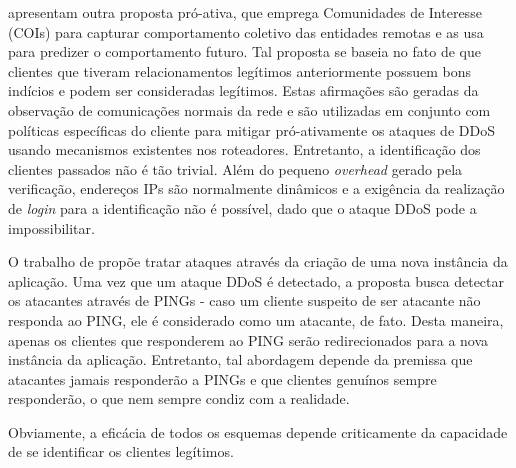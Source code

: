 \documentclass[a4paper, 12pt]{article}
\begin{document}
\cite{Verkaik:2006:PCD:1162666.1162673} apresentam outra proposta pró-ativa, que emprega Comunidades de Interesse (COIs) para capturar comportamento coletivo das entidades remotas e as usa para predizer o comportamento futuro. Tal proposta se baseia no fato de que clientes que tiveram relacionamentos legítimos anteriormente possuem bons indícios e podem ser consideradas legítimos. Estas afirmações são geradas da observação de comunicações normais da rede e são utilizadas em conjunto com políticas específicas do cliente para mitigar pró-ativamente os ataques de DDoS usando mecanismos existentes nos roteadores. 
%
Entretanto, a identificação dos clientes passados não é tão trivial. Além do pequeno \emph{overhead} gerado pela verificação, endereços IPs são normalmente dinâmicos e a exigência da realização de \emph{login} para a identificação não é possível, dado que o ataque DDoS pode a impossibilitar.


O trabalho de \cite{Bakshi:10} propõe tratar ataques através da criação de uma nova instância da aplicação. Uma vez que um ataque DDoS é detectado, a proposta busca detectar os atacantes através de PINGs - caso um cliente suspeito de ser atacante não responda ao PING, ele é considerado como um atacante, de fato. Desta maneira, apenas os clientes que responderem ao PING serão 
redirecionados para a nova instância da aplicação. Entretanto, tal abordagem depende da premissa que atacantes jamais responderão a PINGs e que clientes genuínos sempre responderão, o que nem sempre condiz com a realidade.

Obviamente, a eficácia de todos os esquemas depende criticamente da capacidade de se identificar os clientes legítimos. 


\end{document}
